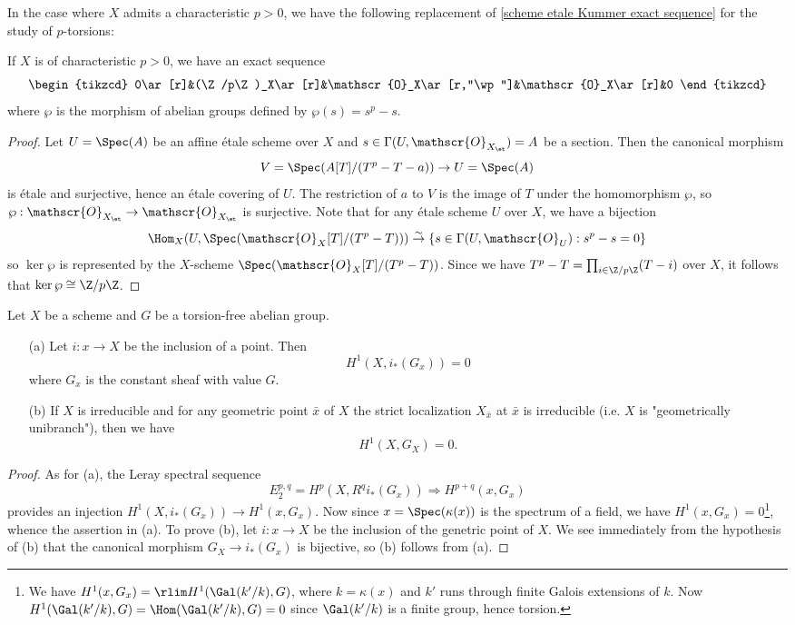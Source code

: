 In the case where $X$ admits a characteristic $p>0$, we have the following replacement of \cref{scheme etale Kummer exact sequence} for the study of $p$-torsions:
\begin{theorem}\label{scheme etale Artin-Schreier exact sequence}
If $X$ is of characteristic $p>0$, we have an exact sequence
\[\begin{tikzcd}
0\ar[r]&(\Z/p\Z)_X\ar[r]&\mathscr{O}_X\ar[r,"\wp"]&\mathscr{O}_X\ar[r]&0
\end{tikzcd}\]
where $\wp$ is the morphism of abelian groups defined by $\wp(s)=s^p-s$.
\end{theorem}
\begin{proof}
Let $U=\Spec(A)$ be an affine \'etale scheme over $X$ and $s\in\Gamma(U,\mathscr{O}_{X_\et})=A$ be a section. Then the canonical morphism
\[V=\Spec(A[T]/(T^p-T-a))\to U=\Spec(A)\]
is \'etale and surjective, hence an \'etale covering of $U$. The restriction of $a$ to $V$ is the image of $T$ under the homomorphism $\wp$, so $\wp:\mathscr{O}_{X_\et}\to\mathscr{O}_{X_\et}$ is surjective. Note that for any \'etale scheme $U$ over $X$, we have a bijection
\[\Hom_X(U,\Spec(\mathscr{O}_X[T]/(T^p-T)))\stackrel{\sim}{\to} \{s\in\Gamma(U,\mathscr{O}_U):s^p-s=0\}\]
so $\ker\wp$ is represented by the $X$-scheme $\Spec(\mathscr{O}_X[T]/(T^p-T))$. Since we have $T^p-T=\prod_{i\in\Z/p\Z}(T-i)$ over $X$, it follows that $\ker\wp\cong\Z/p\Z$.
\end{proof}

\begin{proposition}\label{scheme etale cohomology of torsion-free at point}
Let $X$ be a scheme and $G$ be a torsion-free abelian group.
\begin{enumerate}
    \item[(a)] Let $i:x\to X$ be the inclusion of a point. Then
    \[H^1(X,i_*(G_x))=0\]
    where $G_x$ is the constant sheaf with value $G$.
    \item[(b)] If $X$ is irreducible and for any geometric point $\bar{x}$ of $X$ the strict localization $X_{\bar{x}}$ at $\bar{x}$ is irreducible (i.e. $X$ is "geometrically unibranch"), then we have
    \[H^1(X,G_X)=0.\] 
\end{enumerate}
\end{proposition}
\begin{proof}
As for (a), the Leray spectral sequence
\[E_2^{p,q}=H^p(X,R^qi_*(G_x))\Rightarrow H^{p+q}(x,G_x)\]
provides an injection $H^1(X,i_*(G_x))\to H^1(x,G_x)$. Now since $x=\Spec(\kappa(x))$ is the spectrum of a field, we have $H^1(x,G_x)=0$\footnote{We have $H^1(x,G_x)=\rlim H^1(\Gal(k'/k),G)$, where $k=\kappa(x)$ and $k'$ runs through finite Galois extensions of $k$. Now $H^1(\Gal(k'/k),G)=\Hom(\Gal(k'/k),G)=0$ since $\Gal(k'/k)$ is a finite group, hence torsion.}, whence the assertion in (a). To prove (b), let $i:x\to X$ be the inclusion of the genetric point of $X$. We see immediately from the hypothesis of (b) that the canonical morphism $G_X\to i_*(G_x)$ is bijective, so (b) follows from (a).
\end{proof}

